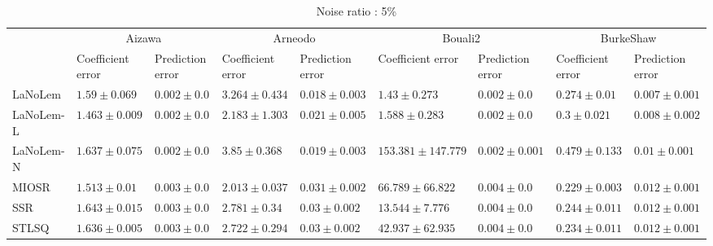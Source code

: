 \begin{table*}
\centering
\caption{Noise ratio : 5\%}
\label{}
\scalebox{0.7}
{
\begin{tabular}{lllllllll}
\toprule
 & \multicolumn{2}{c}{Aizawa} & \multicolumn{2}{c}{Arneodo} & \multicolumn{2}{c}{Bouali2} & \multicolumn{2}{c}{BurkeShaw} \\
 & Coefficient error & Prediction error & Coefficient error & Prediction error & Coefficient error & Prediction error & Coefficient error & Prediction error \\
\midrule
LaNoLem & $1.59\pm 0.069$ & $\mathbf{0.002}\pm 0.0$ & $3.264\pm 0.434$ & $\mathbf{0.018}\pm 0.003$ & $\mathbf{1.43}\pm 0.273$ & $\mathbf{0.002}\pm 0.0$ & $0.274\pm 0.01$ & $\mathbf{0.007}\pm 0.001$ \\
LaNoLem-L & $\mathbf{1.463}\pm 0.009$ & $0.002\pm 0.0$ & $2.183\pm 1.303$ & $0.021\pm 0.005$ & $1.588\pm 0.283$ & $0.002\pm 0.0$ & $0.3\pm 0.021$ & $0.008\pm 0.002$ \\
LaNoLem-N & $1.637\pm 0.075$ & $0.002\pm 0.0$ & $3.85\pm 0.368$ & $0.019\pm 0.003$ & $153.381\pm 147.779$ & $0.002\pm 0.001$ & $0.479\pm 0.133$ & $0.01\pm 0.001$ \\
MIOSR & $1.513\pm 0.01$ & $0.003\pm 0.0$ & $\mathbf{2.013}\pm 0.037$ & $0.031\pm 0.002$ & $66.789\pm 66.822$ & $0.004\pm 0.0$ & $\mathbf{0.229}\pm 0.003$ & $0.012\pm 0.001$ \\
SSR & $1.643\pm 0.015$ & $0.003\pm 0.0$ & $2.781\pm 0.34$ & $0.03\pm 0.002$ & $13.544\pm 7.776$ & $0.004\pm 0.0$ & $0.244\pm 0.011$ & $0.012\pm 0.001$ \\
STLSQ & $1.636\pm 0.005$ & $0.003\pm 0.0$ & $2.722\pm 0.294$ & $0.03\pm 0.002$ & $42.937\pm 62.935$ & $0.004\pm 0.0$ & $0.234\pm 0.011$ & $0.012\pm 0.001$ \\

\midrule


\end{tabular}}
\end{table*}
